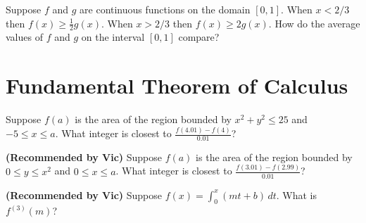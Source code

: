 \documentclass{ximera}
\newcommand{\recommendation}[1]{\textbf{(Recommended by #1)}}
\begin{document}
\begin{problem}
  Suppose $f$ and $g$ are continuous functions on the domain $[0,1]$.  When $x < 2/3$ then $f(x) \geq \frac{1}{2} g(x)$.  When $x > 2/3$ then $f(x) \geq 2 g(x)$.  How do the average values of $f$ and $g$ on the interval $[0,1]$ compare?
  \begin{multipleChoice}
  \end{multipleChoice}
\end{problem}

\clearpage

\section{Fundamental Theorem of Calculus}

\begin{problem}
  Suppose $f(a)$ is the area of the region bounded by $x^2 + y^2 \leq 25$ and $-5 \leq x \leq a$.  What integer is closest to $\frac{f(4.01) - f(4)}{0.01}$?
  \begin{multipleChoice}
  \end{multipleChoice}
\end{problem}

\begin{problem}
\recommendation{Vic}
  Suppose $f(a)$ is the area of the region bounded by $0 \leq y \leq x^2$ and $0 \leq x \leq a$.  What integer is closest to $\frac{f(3.01) - f(2.99)}{0.01}$?
  \begin{multipleChoice}
  \end{multipleChoice}
\end{problem}

\begin{problem}
\recommendation{Vic}
  Suppose $f(x) = \int_0^x \left( mt + b \right) \, dt$.  What is $f^{(3)}(m)$?
  \begin{multipleChoice}
  \end{multipleChoice}
\end{problem}
\end{document}
